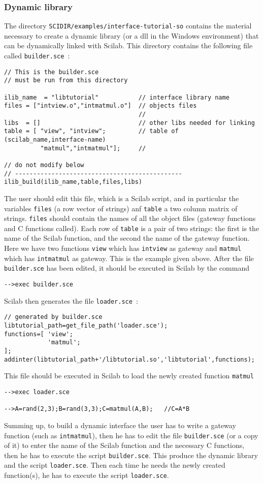 \subsubsection{Dynamic library}
The directory \verb!SCIDIR/examples/interface-tutorial-so! contains the 
material necessary to create a dynamic library (or a dll in the Windows environment) that can be dynamically linked with Scilab. 
This directory contains the following file called \verb!builder.sce!~:
\scriptsize
\begin{verbatim}
// This is the builder.sce 
// must be run from this directory 

ilib_name  = "libtutorial"           // interface library name 
files = ["intview.o","intmatmul.o"]  // objects files 
                                     // 
libs  = []                           // other libs needed for linking
table = [ "view", "intview";         // table of (scilab_name,interface-name)
          "matmul","intmatmul"];     //

// do not modify below 
// ----------------------------------------------
ilib_build(ilib_name,table,files,libs)
\end{verbatim}
\normalsize
The user should edit this file, which is a Scilab script, and 
in particular the variables \verb!files! (a row vector of strings)
anf \verb!table! a two column matrix of strings. 
\verb!files! should contain the names of all the object files 
(gateway functions and C functions called). 
Each row of \verb!table! is a pair of two strings: the first is the
name of the Scilab function, and the second the name of the 
gateway function. Here we have two functions \verb!view! which has
\verb!intview! as gateway and \verb!matmul! which has \verb!intmatmul!
as gateway. This is the example given above.
After the file \verb!builder.sce! has been edited, it should be 
executed in Scilab by the command
\begin{verbatim}
-->exec builder.sce
\end{verbatim}
Scilab then generates the file \verb!loader.sce!~:
\begin{verbatim}
// generated by builder.sce
libtutorial_path=get_file_path('loader.sce');
functions=[ 'view';
            'matmul';
];
addinter(libtutorial_path+'/libtutorial.so','libtutorial',functions);
\end{verbatim}
This file should be executed in Scilab to load the newly created function 
\verb!matmul!
\begin{verbatim}
-->exec loader.sce

-->A=rand(2,3);B=rand(3,3);C=matmul(A,B);   //C=A*B
\end{verbatim}
Summing up, to build a dynamic interface the user has to write a
gateway function (such as \verb!intmatmul!), then he has to edit
the file \verb!builder.sce! (or a copy of it) to enter
the name of the Scilab function and the necessary C functions, 
then he has to execute the script \verb!builder.sce!. This
produce the dynamic library and the script \verb!loader.sce!.
Then each time he needs the newly created function(s), he has to 
execute the script \verb!loader.sce!. 

